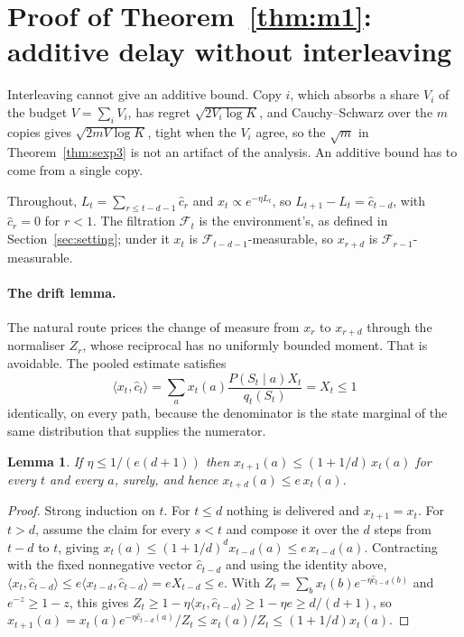 \documentclass{article}
\newtheorem{lemma}{Lemma}
\theoremstyle{remark}
\begin{document}
\section{Proof of Theorem~\ref{thm:m1}: additive delay without interleaving}\label{app:m1}

Interleaving cannot give an additive bound. Copy $i$, which absorbs a share $V_i$ of the budget
$V=\sum_iV_i$, has regret $\sqrt{2V_i\log K}$, and
Cauchy--Schwarz over the $m$ copies gives $\sqrt{2mV\log K}$, tight when the $V_i$ agree, so the
$\sqrt m$ in Theorem~\ref{thm:sexp3} is not an artifact of the analysis. An additive bound has to
come from a single copy.

Throughout, $L_t=\sum_{r\le t-d-1}\hat c_r$ and $x_t\propto e^{-\eta L_t}$, so
$L_{t+1}-L_t=\hat c_{t-d}$, with $\hat c_r=0$ for $r<1$. The filtration $\mathcal F_t$ is the
environment's, as defined in Section~\ref{sec:setting}; under it
$x_t$ is $\mathcal F_{t-d-1}$-measurable, so $x_{r+d}$ is $\mathcal F_{r-1}$-measurable.

\paragraph{The drift lemma.} The natural route prices the change of measure from $x_r$ to
$x_{r+d}$ through the normaliser $Z_r$, whose reciprocal has no uniformly bounded moment. That is
avoidable. The pooled estimate satisfies
\[
\langle x_t,\hat c_t\rangle=\sum_ax_t(a)\frac{P(S_t\mid a)X_t}{q_t(S_t)}=X_t\le1
\]
identically, on every path, because the denominator is the state marginal of the same distribution
that supplies the numerator.

\begin{lemma}\label{lem:drift}
If $\eta\le1/(e(d+1))$ then $x_{t+1}(a)\le(1+1/d)\,x_t(a)$ for every $t$ and every $a$, surely, and
hence $x_{t+d}(a)\le e\,x_t(a)$.
\end{lemma}

\begin{proof}
Strong induction on $t$. For $t\le d$ nothing is delivered and $x_{t+1}=x_t$. For $t>d$, assume the
claim for every $s<t$ and compose it over the $d$ steps from $t-d$ to $t$, giving
$x_t(a)\le(1+1/d)^dx_{t-d}(a)\le e\,x_{t-d}(a)$. Contracting with the fixed nonnegative vector
$\hat c_{t-d}$ and using the identity above,
$\langle x_t,\hat c_{t-d}\rangle\le e\langle x_{t-d},\hat c_{t-d}\rangle=eX_{t-d}\le e$. With
$Z_t=\sum_bx_t(b)e^{-\eta\hat c_{t-d}(b)}$ and $e^{-z}\ge1-z$, this gives
$Z_t\ge1-\eta\langle x_t,\hat c_{t-d}\rangle\ge1-\eta e\ge d/(d+1)$, so
$x_{t+1}(a)=x_t(a)e^{-\eta\hat c_{t-d}(a)}/Z_t\le x_t(a)/Z_t\le(1+1/d)x_t(a)$.
\end{proof}
\end{document}
